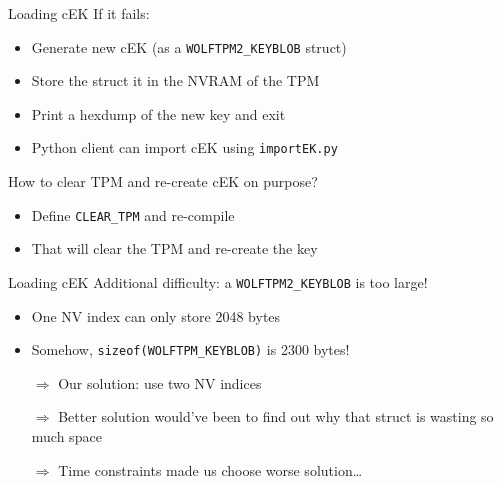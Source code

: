 \begin{frame}{Loading cEK}
If it fails:

\begin{itemize}
\item Generate new cEK (as a \texttt{WOLFTPM2\_KEYBLOB} struct)
\item Store the struct it in the NVRAM of the TPM
\item Print a hexdump of the new key and exit
\item Python client can import cEK using \texttt{importEK.py}
\end{itemize}

How to clear TPM and re-create cEK on purpose?

\begin{itemize}
\item Define \texttt{CLEAR\_TPM} and re-compile
\item That will clear the TPM and re-create the key
\end{itemize}
\end{frame}

\begin{frame}{Loading cEK}
Additional difficulty: a \texttt{WOLFTPM2\_KEYBLOB} is too large!

\begin{itemize}
\item One NV index can only store 2048 bytes
\item Somehow, \texttt{sizeof(WOLFTPM\_KEYBLOB)} is \ttilde{}2300 bytes!
\item[$\Rightarrow$] Our solution: use two NV indices
\item[$\Rightarrow$] Better solution would've been to find out why that struct is wasting so much space
\item[$\Rightarrow$] Time constraints made us choose worse solution\ldots
\end{itemize}
\end{frame}
